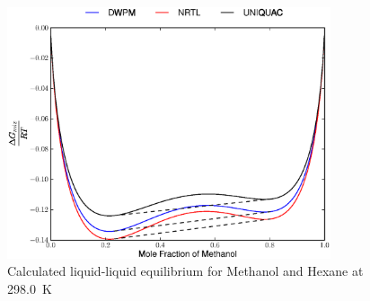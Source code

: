 \begin{figure}[hp]
\centering
\includegraphics[width = 0.85\textwidth]{Results_Parts/BinaryParams/methanol-hexane/AllModelsGibbsPlots/T_298.0.eps}
\caption{Calculated liquid-liquid equilibrium for Methanol and Hexane at 298.0~$\mathrm{K}$} \label{methanol-hexane298}
\end{figure}

\clearpage